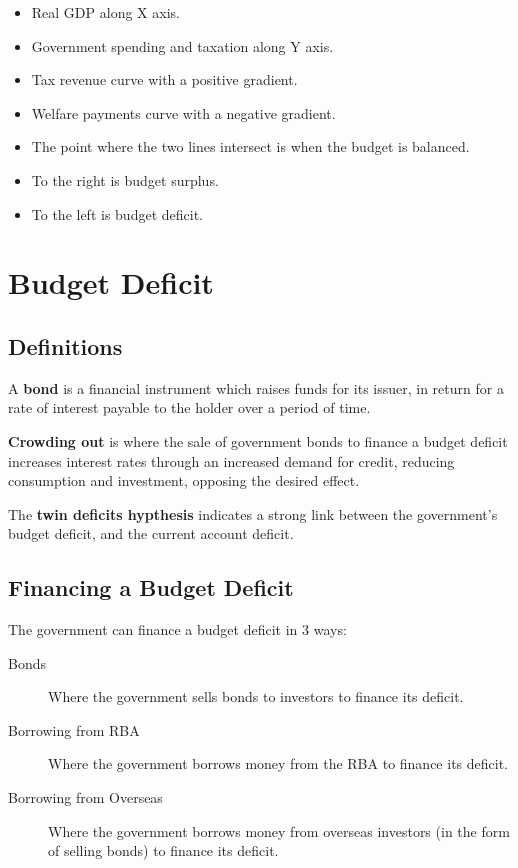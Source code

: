 \documentclass[a4paper,11pt]{report}
\begin{document}
\begin{itemize}
\item Real GDP along X axis.
\item Government spending and taxation along Y axis.
\item Tax revenue curve with a positive gradient.
\item Welfare payments curve with a negative gradient.
\item The point where the two lines intersect is when the budget is balanced.
\item To the right is budget surplus.
\item To the left is budget deficit.
\end{itemize}


\section{Budget Deficit}

\subsection{Definitions}

A \textbf{bond} is a financial instrument which raises funds for its issuer, in
return for a rate of interest payable to the holder over a period of time.

\textbf{Crowding out} is where the sale of government bonds to finance a budget
deficit increases interest rates through an increased demand for credit,
reducing consumption and investment, opposing the desired effect.

The \textbf{twin deficits hypthesis} indicates a strong link between the
government's budget deficit, and the current account deficit.

\subsection{Financing a Budget Deficit}

The government can finance a budget deficit in 3 ways:

\begin{description}
\item [Bonds] Where the government sells bonds to investors to finance its
	deficit.
\item [Borrowing from RBA] Where the government borrows money from the RBA to
	finance its deficit.
\item [Borrowing from Overseas] Where the government borrows money from overseas
	investors (in the form of selling bonds) to finance its deficit.
\end{description}
\end{document}
